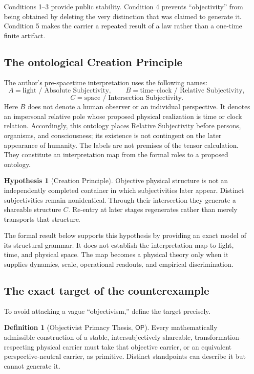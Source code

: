 \documentclass[11pt]{article}
\theoremstyle{definition}
\newtheorem{definition}[theorem]{Definition}
\newtheorem{hypothesis}[theorem]{Hypothesis}
\theoremstyle{remark}
\newcommand{\OPT}{\mathsf{OP}}
\begin{document}
Conditions 1--3 provide public stability. Condition 4 prevents ``objectivity'' from being obtained by deleting the very distinction that was claimed to generate it. Condition 5 makes the carrier a repeated result of a law rather than a one-time finite artifact.

\subsection{The ontological Creation Principle}

The author's pre-spacetime interpretation uses the following names:
\[
 A=\text{light / Absolute Subjectivity},\qquad
 B=\text{time--clock / Relative Subjectivity},
\]
\[
 C=\text{space / Intersection Subjectivity}.
\]
Here $B$ does not denote a human observer or an individual perspective. It denotes an impersonal relative pole whose proposed physical realization is time or clock relation. Accordingly, this ontology places Relative Subjectivity before persons, organisms, and consciousness; its existence is not contingent on the later appearance of humanity.
The labels are not premises of the tensor calculation. They constitute an interpretation map from the formal roles to a proposed ontology.

\begin{hypothesis}[Creation Principle]\label{hyp:cp}
Objective physical structure is not an independently completed container in which subjectivities later appear. Distinct subjectivities remain nonidentical. Through their intersection they generate a shareable structure $C$. Re-entry at later stages regenerates rather than merely transports that structure.
\end{hypothesis}

The formal result below supports this hypothesis by providing an exact model of its structural grammar. It does not establish the interpretation map to light, time, and physical space. The map becomes a physical theory only when it supplies dynamics, scale, operational readouts, and empirical discrimination.

\subsection{The exact target of the counterexample}

To avoid attacking a vague ``objectivism,'' define the target precisely.

\begin{definition}[Objectivist Primacy Thesis, $\OPT$]\label{def:opt}
Every mathematically admissible construction of a stable, intersubjectively shareable, transformation-respecting physical carrier must take that objective carrier, or an equivalent perspective-neutral carrier, as primitive. Distinct standpoints can describe it but cannot generate it.
\end{definition}
\end{document}
